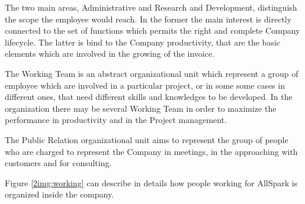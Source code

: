 The two main areas, Administrative and Research and Development, distinguish
the scope the employee would reach. In the former the main interest is
directly connected to the set of functions which permits the right and
complete Company lifecycle. The latter is bind to the Company productivity,
that are the basic elements which are involved in the growing of
the invoice.

The Working Team is an abstract organizational unit which represent a group
of employee which are involved in a particular project, or in some some
cases in different ones, that need different skills and knowledges to be
developed. In the organization there may be several Working Team in order to
maximize the performance in productivity and in the Project management.

The Public Relation organizational unit aims to represent the group of
people who are charged to represent the Company in meetings, in the
approaching with customers and for consulting.

Figure \ref{2img:working} can describe in details how people working for
AllSpark is organized inside the company.

